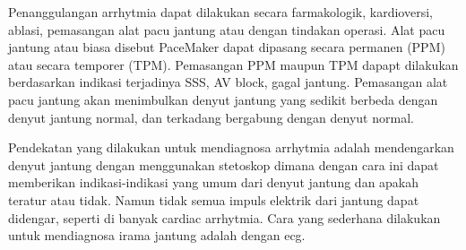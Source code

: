Penanggulangan arrhytmia dapat dilakukan secara farmakologik, kardioversi,
ablasi, pemasangan alat pacu jantung atau dengan tindakan operasi. Alat pacu
jantung atau biasa disebut PaceMaker dapat dipasang secara permanen (PPM) atau
secara temporer (TPM). Pemasangan PPM maupun TPM dapapt dilakukan berdasarkan
indikasi terjadinya SSS,  AV block, gagal jantung. Pemasangan alat pacu jantung
akan menimbulkan denyut jantung yang sedikit berbeda dengan denyut jantung
normal, dan terkadang bergabung dengan denyut normal.

 
Pendekatan yang dilakukan untuk mendiagnosa \gls{arrhytmia} adalah
mendengarkan denyut jantung dengan menggunakan stetoskop dimana dengan cara ini
dapat memberikan indikasi-indikasi yang umum dari denyut jantung dan apakah
teratur atau tidak. Namun tidak semua impuls elektrik dari jantung dapat
didengar, seperti di banyak cardiac arrhytmia. Cara yang sederhana dilakukan
untuk mendiagnosa irama jantung adalah dengan \gls{ecg}.







